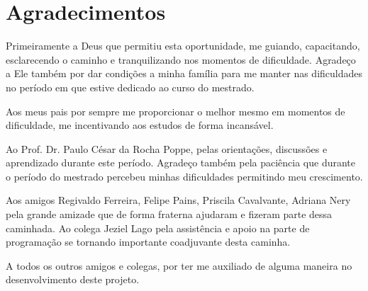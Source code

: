 \chapter*{Agradecimentos}

Primeiramente a Deus que permitiu esta oportunidade, me guiando, capacitando, esclarecendo o caminho e tranquilizando nos momentos de dificuldade. Agradeço a Ele também por dar condições a minha família para me manter nas dificuldades no período em que estive dedicado ao curso do mestrado.

Aos meus pais por sempre me proporcionar o melhor mesmo em momentos de dificuldade, me incentivando aos estudos de forma incansável. 

Ao Prof. Dr. Paulo César da Rocha Poppe, pelas orientações, discussões e aprendizado durante este período. Agradeço também pela paciência que durante o período do mestrado percebeu minhas dificuldades permitindo meu crescimento.

Aos amigos Regivaldo Ferreira, Felipe Pains, Priscila Cavalvante, Adriana Nery pela  grande amizade que de forma fraterna ajudaram e fizeram parte dessa caminhada.
Ao colega Jeziel Lago pela assistência e apoio na parte de programação se tornando importante coadjuvante desta caminha.

A todos os outros amigos e colegas, por ter me auxiliado de alguma maneira no desenvolvimento deste projeto.

\cleardoublepage